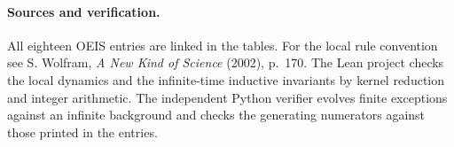 \documentclass[11pt]{article}
\begin{document}
\paragraph{Sources and verification.}
All eighteen OEIS entries are linked in the tables. For the local rule convention
see S. Wolfram, \emph{A New Kind of Science} (2002), p.~170.
The Lean project checks the local dynamics and the infinite-time inductive
invariants by kernel reduction and integer arithmetic. The independent Python
verifier evolves finite exceptions against an infinite background and checks
the generating numerators against those printed in the entries.
\end{document}
